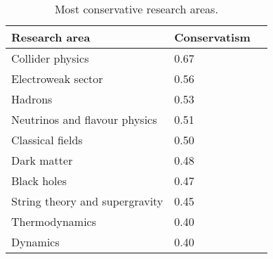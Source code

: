 \begin{table}
\centering
\caption{Most conservative research areas.}
\label{table:most_conservative}
\begin{tabular}{b{}|b{}|c}
\toprule
                 Research area & Conservatism \\ \hline
\midrule
              Collider physics &         0.67 \\ \hline
            Electroweak sector &         0.56 \\ \hline
                       Hadrons &         0.53 \\ \hline
 Neutrinos and flavour physics &         0.51 \\ \hline
              Classical fields &         0.50 \\ \hline
                   Dark matter &         0.48 \\ \hline
                   Black holes &         0.47 \\ \hline
String theory and supergravity &         0.45 \\ \hline
                Thermodynamics &         0.40 \\ \hline
                      Dynamics &         0.40 \\ \hline
\bottomrule
\end{tabular}
\end{table}
